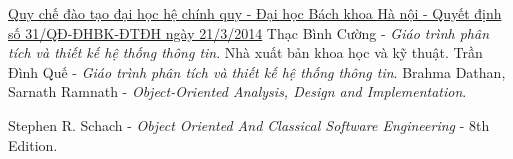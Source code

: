 \newpage

\begin{thebibliography}{9}
\thispagestyle{fancy}
     \href{https://google.com}{Quy chế đào tạo đại học hệ chính quy - Đại học Bách khoa Hà nội - Quyết định số 31/QĐ-ĐHBK-ĐTĐH ngày 21/3/2014}
    Thạc Bình Cường - \textit{Giáo trình phân tích và thiết kế hệ thống thông tin}. Nhà xuất bản khoa học và kỹ thuật.
    Trần Đình Quế - \textit{Giáo trình phân tích và thiết kế hệ thống thông tin}.
    Brahma Dathan, Sarnath Ramnath - \textit{Object-Oriented Analysis, Design and Implementation}.

    Stephen R. Schach - \textit{Object Oriented And Classical Software Engineering} - 8th Edition.

\end{thebibliography}
